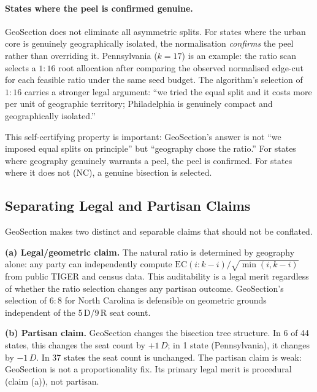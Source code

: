 \paragraph{States where the peel is confirmed genuine.}
GeoSection does not eliminate all asymmetric splits.
For states where the urban core is genuinely geographically isolated, the
normalisation \emph{confirms} the peel rather than overriding it.
Pennsylvania ($k=17$) is an example: the ratio scan selects a $1:16$ root
allocation after comparing the observed normalised edge-cut for each feasible
ratio under the same seed budget.
The algorithm's selection of $1:16$ carries a stronger legal argument:
``we tried the equal split and it costs more per unit of geographic territory;
Philadelphia is genuinely compact and geographically isolated.''

This self-certifying property is important: GeoSection's answer is not ``we
imposed equal splits on principle'' but ``geography chose the ratio.''
For states where geography genuinely warrants a peel, the peel is confirmed.
For states where it does not (NC), a genuine bisection is selected.

\subsection{Separating Legal and Partisan Claims}

GeoSection makes two distinct and separable claims that should not be conflated.

\textbf{(a) Legal/geometric claim.}
The natural ratio is determined by geography alone: any party can independently
compute $\mathrm{EC}(i:k-i)/\sqrt{\min(i,k-i)}$ from public TIGER and census data.
This auditability is a legal merit regardless of whether the ratio selection changes
any partisan outcome.
GeoSection's selection of $6:8$ for North Carolina is defensible on geometric grounds
independent of the 5\,D/9\,R seat count.

\textbf{(b) Partisan claim.}
GeoSection changes the bisection tree structure.
In 6 of 44 states, this changes the seat count by $+1\,D$; in 1 state (Pennsylvania),
it changes by $-1\,D$.
In 37 states the seat count is unchanged.
The partisan claim is weak: GeoSection is not a proportionality fix.
Its primary legal merit is procedural (claim (a)), not partisan.


